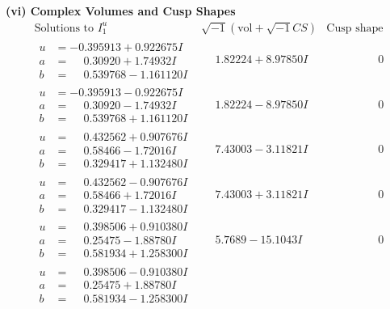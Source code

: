 \documentclass[1p]{elsarticle_modified}
\theoremstyle{definition}
\newcommand{\I}{\sqrt{-1}}
\begin{document}
\newpage\flushleft \textbf{(vi) Complex Volumes and Cusp Shapes}
$$\begin{array}{c|c|c}  
\text{Solutions to }I^u_{1}& \I (\text{vol} + \sqrt{-1}CS) & \text{Cusp shape}\\
 \hline 
\begin{aligned}
u &= -0.395913 + 0.922675 I \\
a &= \phantom{-}0.30920 + 1.74932 I \\
b &= \phantom{-}0.539768 - 1.161120 I\end{aligned}
 & \phantom{-}1.82224 + 8.97850 I & \phantom{-0.000000 } 0 \\ \hline\begin{aligned}
u &= -0.395913 - 0.922675 I \\
a &= \phantom{-}0.30920 - 1.74932 I \\
b &= \phantom{-}0.539768 + 1.161120 I\end{aligned}
 & \phantom{-}1.82224 - 8.97850 I & \phantom{-0.000000 } 0 \\ \hline\begin{aligned}
u &= \phantom{-}0.432562 + 0.907676 I \\
a &= \phantom{-}0.58466 - 1.72016 I \\
b &= \phantom{-}0.329417 + 1.132480 I\end{aligned}
 & \phantom{-}7.43003 - 3.11821 I & \phantom{-0.000000 } 0 \\ \hline\begin{aligned}
u &= \phantom{-}0.432562 - 0.907676 I \\
a &= \phantom{-}0.58466 + 1.72016 I \\
b &= \phantom{-}0.329417 - 1.132480 I\end{aligned}
 & \phantom{-}7.43003 + 3.11821 I & \phantom{-0.000000 } 0 \\ \hline\begin{aligned}
u &= \phantom{-}0.398506 + 0.910380 I \\
a &= \phantom{-}0.25475 - 1.88780 I \\
b &= \phantom{-}0.581934 + 1.258300 I\end{aligned}
 & \phantom{-}5.7689 - 15.1043 I & \phantom{-0.000000 } 0 \\ \hline\begin{aligned}
u &= \phantom{-}0.398506 - 0.910380 I \\
a &= \phantom{-}0.25475 + 1.88780 I \\
b &= \phantom{-}0.581934 - 1.258300 I\end{aligned}

\end{array}$$
\end{document}
